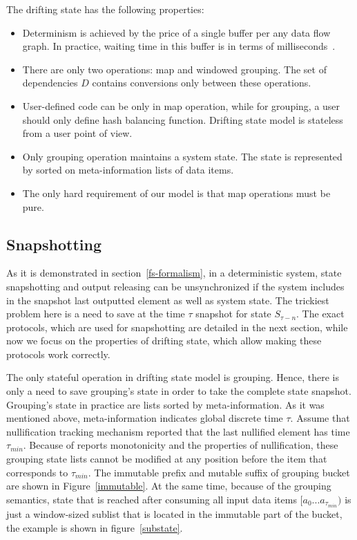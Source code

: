 The drifting state has the following properties:
\begin{itemize}
    \item Determinism is achieved by the price of a single buffer per any data flow graph. In practice, waiting time in this buffer is in terms of milliseconds~\cite{we2018adbis}.
    \item There are only two operations: map and windowed grouping. The set of dependencies $D$ contains conversions only between these operations.
    \item User-defined code can be only in map operation, while for grouping, a user should only define hash balancing function. Drifting state model is stateless from a user point of view.
    \item Only grouping operation maintains a system state. The state is represented by sorted on meta-information lists of data items.
    \item The only hard requirement of our model is that map operations must be pure.
\end{itemize}

\subsection{Snapshotting}

As it is demonstrated in section~\ref{fs-formalism}, in a deterministic system, state snapshotting and output releasing can be unsynchronized if the system includes in the snapshot last outputted element as well as system state. The trickiest problem here is a need to save at the time $\tau$ snapshot for state $S_{\tau-n}$. The exact protocols, which are used for snapshotting are detailed in the next section, while now we focus on the properties of drifting state, which allow making these protocols work correctly. 

The only stateful operation in drifting state model is grouping. Hence, there is only a need to save grouping's state in order to take the complete state snapshot. Grouping's state in practice are lists sorted by meta-information. As it was mentioned above, meta-information indicates global discrete time $\tau$. Assume that nullification tracking mechanism reported that the last nullified element has time $\tau_{min}$. Because of reports monotonicity and the properties of nullification, these grouping state lists cannot be modified at any position before the item that corresponds to $\tau_{min}$. The immutable prefix and mutable suffix of grouping bucket are shown in Figure~\ref{immutable}. At the same time, because of the grouping semantics, state that is reached after consuming all input data items $[a_{0}...a_{\tau_{min}})$ is just a window-sized sublist that is located in the immutable part of the bucket, the example is shown in figure~\ref{substate}. 

